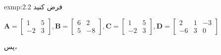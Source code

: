 {\begin{spacing}{1.5}
        \begin{exmp}{exmp:2.2}
            \Large
            فرض کنید
            \begin{center}
                $\textbf{A}=\begin{bmatrix}
                                1  & 5 \\
                                -2 & 3
                \end{bmatrix}, \textbf{B}=\begin{bmatrix}
                                              6 & 2  \\
                                              5 & -8
                \end{bmatrix}, \textbf{C}=\begin{bmatrix}
                                              1  & 5 \\
                                              -2 & 3
                \end{bmatrix}, \textbf{D}=\begin{bmatrix}
                                              2  & 1 & -3 \\
                                              -6 & 3 & 0
                \end{bmatrix}$
            \end{center}
            \textbf{\vspace{12pt}}
            پس،
\end{exmp}
\end{spacing}}
